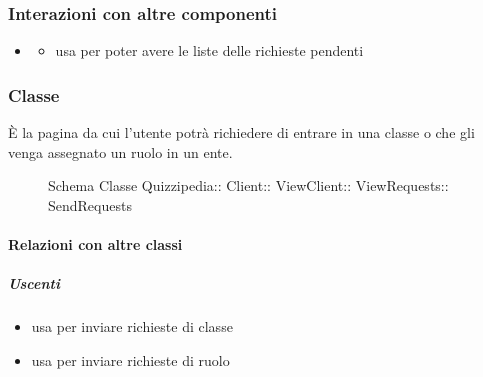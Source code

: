 \subsubsection{Interazioni con altre componenti}
\begin{itemize}
\item {}
\begin{itemize}
\item usa  per poter avere le liste delle richieste pendenti
\end{itemize}
\end{itemize}
\subsubsection{Classe }
È la pagina da cui l'utente potrà richiedere di entrare in una classe o che gli venga assegnato un ruolo in un ente.
\begin{figure}[H]
\centering
\noindent{}
\caption[Schema Classe SendRequests]{Schema Classe Quizzipedia:: Client:: ViewClient:: ViewRequests:: SendRequests}
\end{figure}
\paragraph{Relazioni con altre classi}
\subparagraph{Uscenti}
\begin{itemize}
\item usa  per inviare richieste di classe
\item usa  per inviare richieste di ruolo
\end{itemize}

